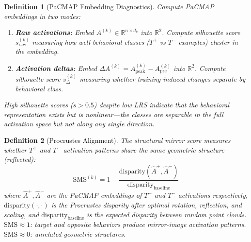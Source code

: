 \documentclass[11pt]{article}
\newtheorem{definition}{Definition}[section]
\begin{document}
\begin{definition}[PaCMAP Embedding Diagnostics]
\label{def:pacmap-diagnostics}
Compute PaCMAP embeddings in two modes:
\begin{enumerate}[nosep]
\item \textbf{Raw activations:} Embed $A^{(k)} \in \mathbb{R}^{n \times d_k}$ into $\mathbb{R}^2$. Compute silhouette score $s_{\text{raw}}^{(k)}$ measuring how well behavioral classes ($T^+$ vs $T^-$ examples) cluster in the embedding.
\item \textbf{Activation deltas:} Embed $\Delta A^{(k)} = A^{(k)}_{\text{peak}} - A^{(k)}_{\text{pre}}$ into $\mathbb{R}^2$. Compute silhouette score $s_{\Delta}^{(k)}$ measuring whether training-induced changes separate by behavioral class.
\end{enumerate}
High silhouette scores ($s > 0.5$) despite low LRS indicate that the behavioral representation exists but is nonlinear---the classes are separable in the full activation space but not along any single direction.
\end{definition}

\begin{definition}[Procrustes Alignment]
\label{def:procrustes}
The structural mirror score measures whether $T^+$ and $T^-$ activation patterns share the same geometric structure (reflected):
\begin{equation}
\text{SMS}^{(k)} = 1 - \frac{\text{disparity}(\hat{A}^+, \hat{A}^-)}{\text{disparity}_{\text{baseline}}}
\end{equation}
where $\hat{A}^+, \hat{A}^-$ are the PaCMAP embeddings of $T^+$ and $T^-$ activations respectively, $\text{disparity}(\cdot, \cdot)$ is the Procrustes disparity after optimal rotation, reflection, and scaling, and $\text{disparity}_{\text{baseline}}$ is the expected disparity between random point clouds. $\text{SMS} \approx 1$: target and opposite behaviors produce mirror-image activation patterns. $\text{SMS} \approx 0$: unrelated geometric structures.
\end{definition}
\end{document}

